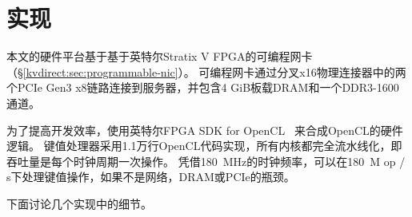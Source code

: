 \section{实现}
\label{kvdirect:sec:implementation}



本文的硬件平台基于基于英特尔Stratix V FPGA的可编程网卡（\S \ref {kvdirect:sec:programmable-nic}）。
可编程网卡通过分叉x16物理连接器中的两个PCIe Gen3 x8链路连接到服务器，并包含4 GiB板载DRAM和一个DDR3-1600通道。

为了提高开发效率，使用英特尔FPGA SDK for OpenCL~ \cite {aoc}来合成OpenCL的硬件逻辑。
键值处理器采用1.1万行OpenCL代码实现，所有内核都完全流水线化，即吞吐量是每个时钟周期一次操作。
凭借180~MHz的时钟频率，可以在180~M op / s下处理键值操作，如果不是网络，DRAM或PCIe的瓶颈。
%

下面讨论几个实现中的细节。


